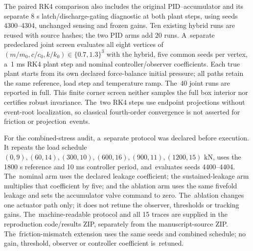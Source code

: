 \documentclass[machines,article,submit,pdftex,moreauthors]{Definitions/mdpi}
\begin{document}
The paired RK4 comparison also includes the original PID--accumulator and its separate 8 s latch/discharge-gating diagnostic at both plant steps, using seeds 4300--4304, unchanged sensing and frozen gains. Ten existing hybrid runs are reused with source hashes; the two PID arms add 20 runs. A~separate predeclared joint screen evaluates all eight vertices of $(m/m_0,c/c_0,k/k_0)\in\{0.7,1.3\}^3$ with the hybrid, five common seeds per vertex, a~1 ms RK4 plant step and nominal controller/observer coefficients. Each true plant starts from its own declared force-balance initial pressure; all paths retain the same reference, load step and temperature ramp. The~40 joint runs are reported in full. This finite corner screen neither samples the full box interior nor certifies robust invariance. The~two RK4 steps use endpoint projections without event-root localization, so classical fourth-order convergence is not asserted for friction or projection~events.

For the combined-stress audit, a~separate protocol was declared before execution. It repeats the load schedule $(0,9),(60,14),(300,10),(600,16),(900,11),(1200,15)$ kN, uses the 1800 s reference and 10 ms controller period, and~evaluates seeds 4400--4404. The~nominal arm uses the declared leakage coefficient; the sustained-leakage arm multiplies that coefficient by five; and the ablation arm uses the same fivefold leakage and sets the accumulator valve command to zero. The~ablation changes one actuator path only; it does not retune the observer, thresholds or tracking gains. The~machine-readable protocol and all 15 traces are supplied in the reproduction code/results ZIP, separately from the manuscript-source ZIP. The~friction-mismatch extension uses the same seeds and combined schedule; no gain, threshold, observer or controller coefficient is~retuned.
\end{document}
